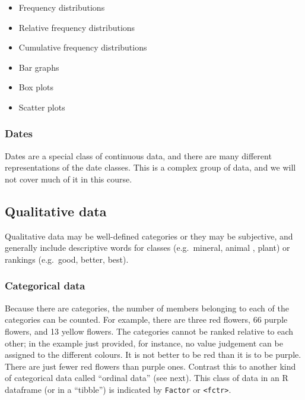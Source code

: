 \documentclass[english,10pt,a4paper,oneside]{book}
\providecommand{\tightlist}{%
  \setlength{\itemsep}{0pt}\setlength{\parskip}{0pt}}
\theoremstyle{definition}
\theoremstyle{definition}
\theoremstyle{definition}
\theoremstyle{remark}
\begin{document}
\begin{itemize}
\tightlist
\item
  Frequency distributions
\item
  Relative frequency distributions
\item
  Cumulative frequency distributions
\item
  Bar graphs
\item
  Box plots
\item
  Scatter plots
\end{itemize}

\hypertarget{dates}{%
\subsubsection{Dates}\label{dates}}

Dates are a special class of continuous data, and there are many
different representations of the date classes. This is a complex group
of data, and we will not cover much of it in this course.

\hypertarget{qualitative-data}{%
\subsection{Qualitative data}\label{qualitative-data}}

Qualitative data may be well-defined categories or they may be
subjective, and generally include descriptive words for classes
(e.g.~mineral, animal , plant) or rankings (e.g.~good, better, best).

\hypertarget{categorical-data}{%
\subsubsection{Categorical data}\label{categorical-data}}

Because there are categories, the number of members belonging to each of
the categories can be counted. For example, there are three red flowers,
66 purple flowers, and 13 yellow flowers. The categories cannot be
ranked relative to each other; in the example just provided, for
instance, no value judgement can be assigned to the different colours.
It is not better to be red than it is to be purple. There are just fewer
red flowers than purple ones. Contrast this to another kind of
categorical data called \enquote{ordinal data} (see next). This class of
data in an R dataframe (or in a \enquote{tibble}) is indicated by
\texttt{Factor} or \texttt{\textless{}fctr\textgreater{}}.
\end{document}
